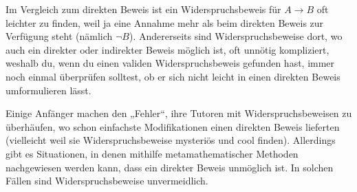  
\begin{bem}
    Im Vergleich zum direkten Beweis ist ein Widerspruchsbeweis für $A\to B$ oft leichter zu finden, weil ja eine Annahme mehr als beim direkten Beweis zur Verfügung steht (nämlich $\neg B$). Andererseits sind Widerspruchsbeweise dort, wo auch ein direkter oder indirekter Beweis möglich ist, oft unnötig kompliziert, weshalb du, wenn du einen validen Widerspruchsbeweis gefunden hast, immer noch einmal überprüfen solltest, ob er sich nicht leicht in einen direkten Beweis umformulieren lässt.
    
    Einige Anfänger machen den „Fehler“, ihre Tutoren mit Widerspruchsbeweisen zu überhäufen, wo schon einfachste Modifikationen einen direkten Beweis lieferten (vielleicht weil sie Widerspruchsbeweise mysteriös und cool finden). Allerdings gibt es Situationen, in denen mithilfe metamathematischer Methoden nachgewiesen werden kann, dass ein direkter Beweis unmöglich ist. In solchen Fällen sind Widerspruchsbeweise unvermeidlich.
\end{bem}
  
